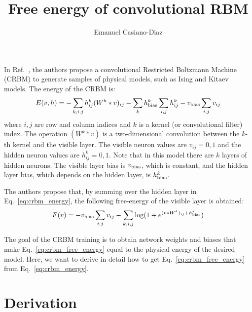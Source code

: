 \documentclass[12pt]{article}
\newcommand{\Eqref}[1]{Eq.~\eqref{#1}}
\begin{document}

\title{Free energy of convolutional RBM}%
\author{Emanuel Casiano-Diaz}
\maketitle

In Ref.~\cite{Alcalde_Puente_2020}, the authors propose a convolutional Restricted Boltzmann Machine (CRBM) to generate samples of physical models, such as Ising and Kitaev models. The energy of the CRBM is:
%
\begin{equation}
E(v,h) = -\sum_{k,i,j} h_{ij}^k (W^k * v)_{ij} - \sum_{k} h_{\rm{bias}}^k \sum_{i,j} h_{ij}^k - v_{\rm{bias}} \sum_{i,j} v_{ij}
\label{eq:crbm_energy}
\end{equation}
%
where $i,j$ are row and column indices and $k$ is a kernel (or convolutional filter) index. The operation $(W^k * v)$ is a two-dimensional convolution between the $k$-th kernel and the visible layer. The visible neuron values are $v_{ij}=0,1$ and the hidden neuron values are $h_{ij}^k=0,1$. Note that in this model there are $k$ layers of hidden neurons. The visible layer bias is $v_{\rm{bias}}$, which is constant, and the hidden layer bias, which depends on the hidden layer, is $h_{\rm{bias}}^k$.

The authors propose that, by summing over the hidden layer in \Eqref{eq:crbm_energy}, the following free-energy of the visible layer is obtained:
%
\begin{equation}
F(v) = -v_{\rm{bias}} \sum_{i,j} v_{ij} - \sum_{k,i,j} \log(1 + e^{(v * W^k)_{ij} + h_{\rm{bias}}^k})
\label{eq:crbm_free_energy}
\end{equation}
%

The goal of the CRBM training is to obtain network weights and biases that make \Eqref{eq:crbm_free_energy} equal to the physical energy of the desired model. Here, we want to derive in detail how to get \Eqref{eq:crbm_free_energy} from \Eqref{eq:crbm_energy}.

\section*{Derivation}
\end{document}
